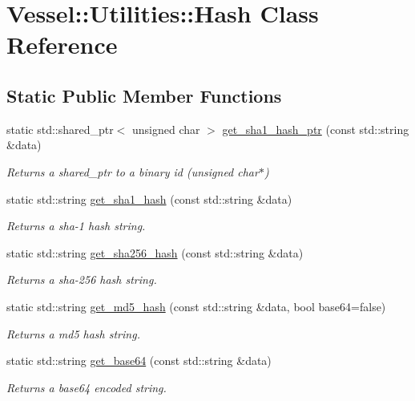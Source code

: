 \hypertarget{class_vessel_1_1_utilities_1_1_hash}{}\section{Vessel\+:\+:Utilities\+:\+:Hash Class Reference}
\label{class_vessel_1_1_utilities_1_1_hash}
\subsection*{Static Public Member Functions}
\begin{DoxyCompactItemize}
\item 
static std\+::shared\+\_\+ptr$<$ unsigned char $>$ \hyperlink{class_vessel_1_1_utilities_1_1_hash_aae24b1d2642ec244551857894a13f533}{get\+\_\+sha1\+\_\+hash\+\_\+ptr} (const std\+::string \&data)
\begin{DoxyCompactList}\small\item\em Returns a shared\+\_\+ptr to a binary id (unsigned char$\ast$) \end{DoxyCompactList}\item 
static std\+::string \hyperlink{class_vessel_1_1_utilities_1_1_hash_aac0daddfa7414c8e9ee27c1f4b811e6c}{get\+\_\+sha1\+\_\+hash} (const std\+::string \&data)
\begin{DoxyCompactList}\small\item\em Returns a sha-\/1 hash string. \end{DoxyCompactList}\item 
static std\+::string \hyperlink{class_vessel_1_1_utilities_1_1_hash_ac2947d4601160bd693f94fbb03a567c2}{get\+\_\+sha256\+\_\+hash} (const std\+::string \&data)
\begin{DoxyCompactList}\small\item\em Returns a sha-\/256 hash string. \end{DoxyCompactList}\item 
static std\+::string \hyperlink{class_vessel_1_1_utilities_1_1_hash_a453b9f3c511af3c444b8aca245ee9405}{get\+\_\+md5\+\_\+hash} (const std\+::string \&data, bool base64=false)
\begin{DoxyCompactList}\small\item\em Returns a md5 hash string. \end{DoxyCompactList}\item 
static std\+::string \hyperlink{class_vessel_1_1_utilities_1_1_hash_ae618a6d2856efcf77399aab0dc8d7848}{get\+\_\+base64} (const std\+::string \&data)
\begin{DoxyCompactList}\small\item\em Returns a base64 encoded string. \end{DoxyCompactList}\item 

\end{DoxyCompactItemize}
